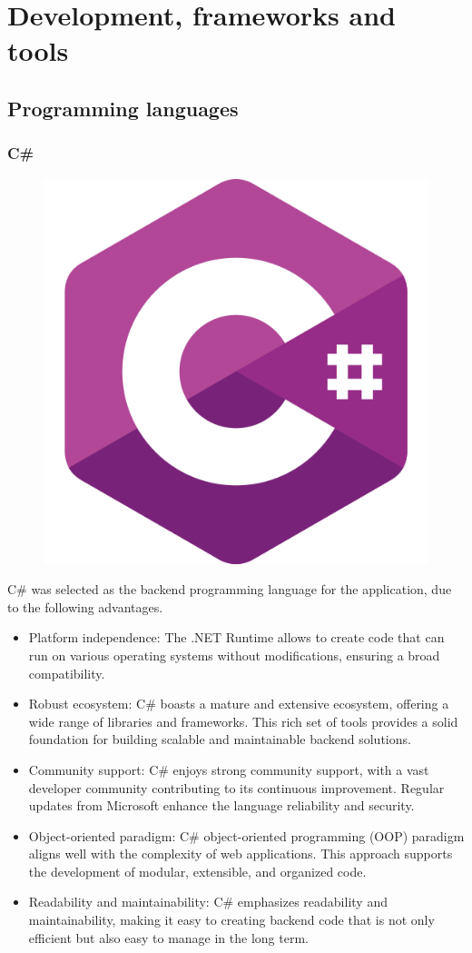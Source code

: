 \chapter{Development, frameworks and tools}

\section{Programming languages}

\subsection{C\#}

\begin{figure}[H]
    \hfill
    \includegraphics[width=0.1\linewidth]{../assets/tools-logos/c-sharp.png}
    \hspace{1cm}
\end{figure}

C\# was selected as the backend programming language for the application, due to the following advantages.

\begin{itemize}

    \item Platform independence: The .NET Runtime allows to create code that can run on various operating systems without modifications, ensuring a broad compatibility.
    \item Robust ecosystem: C\# boasts a mature and extensive ecosystem, offering a wide range of libraries and frameworks.
    This rich set of tools provides a solid foundation for building scalable and maintainable backend solutions.
    \item Community support: C\# enjoys strong community support, with a vast developer community contributing to its continuous improvement.
    Regular updates from Microsoft enhance the language reliability and security.
    \item Object-oriented paradigm: C\# object-oriented programming (OOP) paradigm aligns well with the complexity of web applications.
    This approach supports the development of modular, extensible, and organized code.
    \item Readability and maintainability: C\# emphasizes readability and maintainability, making it easy to creating backend code that is not only efficient but also easy to manage in the long term.

\end{itemize}

